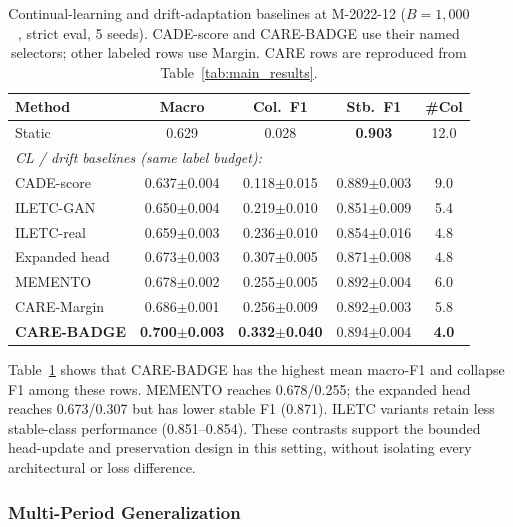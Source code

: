 \documentclass[journal]{IEEEtran}
\newcommand{\ours}{CARE}  %
\begin{document}
\begin{table}[!htbp]
\centering
\caption{Continual-learning and drift-adaptation baselines at M-2022-12 ($B{=}1{,}000$, strict eval, 5 seeds). CADE-score and CARE-BADGE use their named selectors; other labeled rows use Margin. CARE rows are reproduced from Table~\ref{tab:main_results}.}
\label{tab:cl_baselines}
\scriptsize
\setlength{\tabcolsep}{3pt}
\begin{tabular}{@{}l cccc@{}}
\toprule
Method & Macro & Col.\ F1 & Stb.\ F1 & \#Col \\
\midrule
Static & 0.629 & 0.028 & \textbf{0.903} & 12.0 \\
\midrule
\multicolumn{5}{l}{\textit{CL / drift baselines (same label budget):}} \\
CADE-score~\cite{yang2021cade}     & 0.637$\pm$0.004 & 0.118$\pm$0.015 & 0.889$\pm$0.003 & 9.0 \\
ILETC-GAN~\cite{zhu2023iletc}     & 0.650$\pm$0.004 & 0.219$\pm$0.010 & 0.851$\pm$0.009 & 5.4 \\
ILETC-real                         & 0.659$\pm$0.003 & 0.236$\pm$0.010 & 0.854$\pm$0.016 & 4.8 \\
Expanded head                      & 0.673$\pm$0.003 & 0.307$\pm$0.005 & 0.871$\pm$0.008 & 4.8 \\
MEMENTO~\cite{cerasuolo2024memento}& 0.678$\pm$0.002 & 0.255$\pm$0.005 & 0.892$\pm$0.004 & 6.0 \\
\midrule
\ours{}-Margin & 0.686$\pm$0.001 & 0.256$\pm$0.009 & 0.892$\pm$0.003 & 5.8 \\
\textbf{\ours{}-BADGE} & \textbf{0.700$\pm$0.003} & \textbf{0.332$\pm$0.040} & 0.894$\pm$0.004 & \textbf{4.0} \\
\bottomrule
\end{tabular}
\end{table}


Table~\ref{tab:cl_baselines} shows that CARE-BADGE has the highest mean macro-F1 and collapse F1 among these rows. MEMENTO reaches 0.678/0.255; the expanded head reaches 0.673/0.307 but has lower stable F1 (0.871). ILETC variants retain less stable-class performance (0.851--0.854). These contrasts support the bounded head-update and preservation design in this setting, without isolating every architectural or loss difference.

\subsubsection{Multi-Period Generalization}
\label{sec:multi_period}
\end{document}
